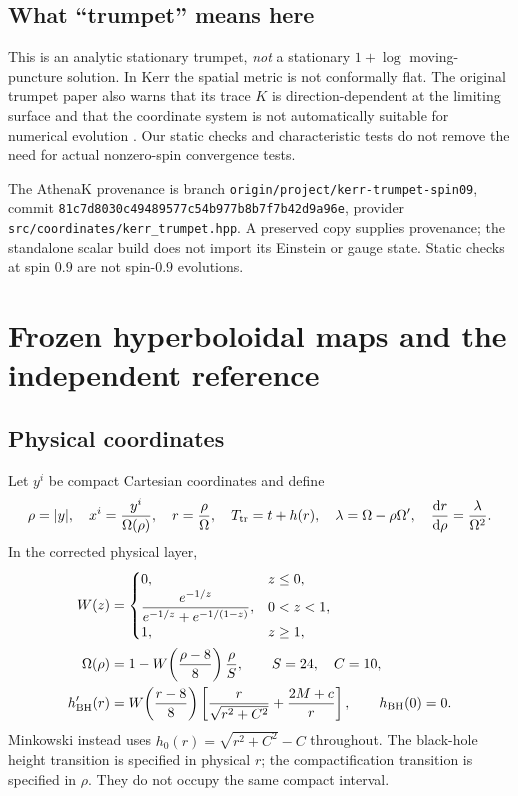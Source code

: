 \documentclass[11pt,letterpaper]{article}
\newcommand{\dd}{\mathrm{d}}
\newcommand{\epath}[1]{\texttt{\small\nolinkurl{#1}}}
\begin{document}
\subsection{What ``trumpet'' means here}
This is an analytic stationary trumpet, \emph{not} a stationary $1+\log$ moving-puncture solution. In Kerr the spatial metric is not conformally flat. The original trumpet paper also warns that its trace $K$ is direction-dependent at the limiting surface and that the coordinate system is not automatically suitable for numerical evolution \cite{trumpet}. Our static checks and characteristic tests do not remove the need for actual nonzero-spin convergence tests.

The AthenaK provenance is branch \epath{origin/project/kerr-trumpet-spin09}, commit \epath{81c7d8030c49489577c54b977b8b7f7b42d9a96e}, provider \epath{src/coordinates/kerr_trumpet.hpp}. A preserved copy supplies provenance; the standalone scalar build does not import its Einstein or gauge state. Static checks at spin $0.9$ are not spin-$0.9$ evolutions.

\clearpage
\section{Frozen hyperboloidal maps and the independent reference}
\subsection{Physical coordinates}
Let $y^i$ be compact Cartesian coordinates and define
\begin{equation}\label{eq:map}
 \rho=|y|,\quad x^i=\frac{y^i}{\Omega(\rho)},\quad r=\frac{\rho}{\Omega},\quad
 T_{\rm tr}=t+h(r),\quad \lambda=\Omega-\rho\Omega',\quad
 \frac{\dd r}{\dd\rho}=\frac{\lambda}{\Omega^2}.
\end{equation}
In the corrected physical layer,
\begin{align}
 W(z)&=\begin{cases}0,&z\leq0,\\
 \displaystyle\frac{e^{-1/z}}{e^{-1/z}+e^{-1/(1-z)}},&0<z<1,\\
 1,&z\geq1,\end{cases}\\
 \Omega(\rho)&=1-W\!\left(\frac{\rho-8}{8}\right)\frac{\rho}{S},\qquad S=24,\quad C=10,\\
 h'_{\rm BH}(r)&=W\!\left(\frac{r-8}{8}\right)
 \left[\frac{r}{\sqrt{r^2+C^2}}+\frac{2M+c}{r}\right],\qquad h_{\rm BH}(0)=0.
\end{align}
Minkowski instead uses $h_0(r)=\sqrt{r^2+C^2}-C$ throughout. The black-hole height transition is specified in physical $r$; the compactification transition is specified in $\rho$. They do not occupy the same compact interval.
\end{document}
